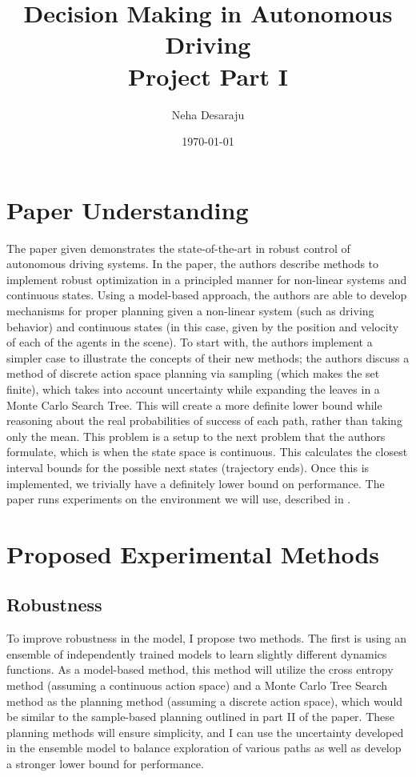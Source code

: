 \documentclass{article}
\title{Decision Making in Autonomous Driving \\ Project Part I}
\author{Neha Desaraju}
\date{\today}
\begin{document}
\maketitle

\section{Paper Understanding}

The paper \cite{leurent2019approximate} given demonstrates the state-of-the-art in robust control of autonomous driving systems. In the paper, the authors describe methods to implement robust optimization in a principled manner for non-linear systems and continuous states. Using a model-based approach, the authors are able to develop mechanisms for proper planning given a non-linear system (such as driving behavior) and continuous states (in this case, given by the position and velocity of each of the agents in the scene). To start with, the authors implement a simpler case to illustrate the concepts of their new methods; the authors discuss a method of discrete action space planning via sampling (which makes the set finite), which takes into account uncertainty while expanding the leaves in a Monte Carlo Search Tree. This will create a more definite lower bound while reasoning about the real probabilities of success of each path, rather than taking only the mean. This problem is a setup to the next problem that the authors formulate, which is when the state space is continuous. This calculates the closest interval bounds for the possible next states (trajectory ends). Once this is implemented, we trivially have a definitely lower bound on performance. The paper runs experiments on the environment we will use, described in \cite{highway-env}.

\section{Proposed Experimental Methods}

\subsection{Robustness}

To improve robustness in the model, I propose two methods. The first is using an ensemble of independently trained models \cite{wu2021uncertaintyaware} to learn slightly different dynamics functions. As a model-based method, this method will utilize the cross entropy method (assuming a continuous action space) and a Monte Carlo Tree Search method as the planning method (assuming a discrete action space), which would be similar to the sample-based planning outlined in part II of the paper. These planning methods will ensure simplicity, and I can use the uncertainty developed in the ensemble model to balance exploration of various paths as well as develop a stronger lower bound for performance.
\end{document}
